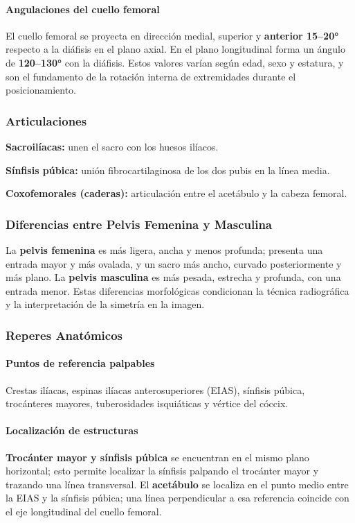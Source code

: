 	\paragraph{Angulaciones del cuello femoral}
	El cuello femoral se proyecta en dirección medial, superior y \textbf{anterior 15--20°} respecto
	a la diáfisis en el plano axial. En el plano longitudinal forma un ángulo de \textbf{120--130°}
	con la diáfisis. Estos valores varían según edad, sexo y estatura, y son el fundamento de la
	rotación interna de extremidades durante el posicionamiento.
	
	\subsubsection*{Articulaciones}
	
	\textbf{Sacroilíacas:} unen el sacro con los huesos ilíacos.
	
	\textbf{Sínfisis púbica:} unión fibrocartilaginosa de los dos pubis en la línea media.
	
	\textbf{Coxofemorales (caderas):} articulación entre el acetábulo y la cabeza femoral.
	
	\subsubsection*{Diferencias entre Pelvis Femenina y Masculina}
	
	La \textbf{pelvis femenina} es más ligera, ancha y menos profunda; presenta una entrada
	mayor y más ovalada, y un sacro más ancho, curvado posteriormente y más plano.
	La \textbf{pelvis masculina} es más pesada, estrecha y profunda, con una entrada menor.
	Estas diferencias morfológicas condicionan la técnica radiográfica y la interpretación
	de la simetría en la imagen.
	
	\subsubsection*{Reperes Anatómicos}
	
	\paragraph{Puntos de referencia palpables}
	Crestas ilíacas, espinas ilíacas anterosuperiores (EIAS), sínfisis púbica, trocánteres
	mayores, tuberosidades isquiáticas y vértice del cóccix.
	
	\paragraph{Localización de estructuras}
	\textbf{Trocánter mayor y sínfisis púbica} se encuentran en el mismo plano horizontal;
	esto permite localizar la sínfisis palpando el trocánter mayor y trazando una línea
	transversal. El \textbf{acetábulo} se localiza en el punto medio entre la EIAS y la
	sínfisis púbica; una línea perpendicular a esa referencia coincide con el eje
	longitudinal del cuello femoral.
	
